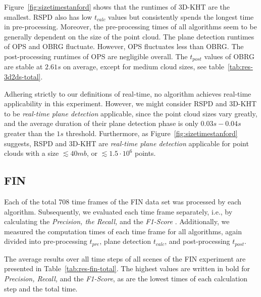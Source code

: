 \documentclass[main.tex]{subfiles}
\begin{document}
Figure~\ref{fig:sizetimestanford} shows that the runtimes of 3D-KHT are the smallest. RSPD also has low $t_{calc}$ values
but consistently spends the longest time in pre-processing.
Moreover, the pre-processing times of all algorithms seem to be generally dependent on the size of the point cloud.
The plane detection runtimes of OPS and OBRG fluctuate. However, OPS fluctuates less than OBRG.
The post-processing runtimes of OPS are negligible overall. The $t_{post}$ values of OBRG are stable at $2.61s$ on average,
except for medium cloud sizes, see table~\ref{tab:res-3d2ds-total}.

Adhering strictly to our definitions of real-time, no algorithm achieves real-time applicability in this experiment.
However, we might consider RSPD and 3D-KHT to be \textit{real-time plane detection} applicable, since
the point cloud sizes vary greatly, and the average duration of their plane detection phase is only
$0.03s-0.04s$ greater than the $1s$ threshold.
Furthermore, as Figure~\ref{fig:sizetimestanford} suggests, RSPD and 3D-KHT are
\textit{real-time plane detection} applicable for point clouds with a size ${\lesssim}40mb$, or
${\lesssim}1.5{\cdot}10^6$ points.

\subsection{FIN}
Each of the total 708 time frames of the FIN data set was processed by each algorithm.
Subsequently, we evaluated each time frame separately, i.e., by calculating the \textit{Precision, the Recall,} and the \textit{F1-Score} .
Additionally, we measured the computation times of each time frame for all algorithms, again divided into pre-processing $t_{pre}$,
plane detection $t_{calc}$, and post-processing $t_{post}$.

The average results over all time steps of all scenes of the FIN experiment are presented in Table~\ref{tab:res-fin-total}.
The highest values are written in bold for \textit{Precision, Recall,} and the \textit{F1-Score}, as are the lowest times of each calculation step and the 
total time.
\end{document}
